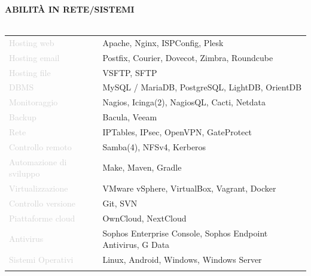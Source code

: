 \documentclass{article}
\begin{document}
\textbf{\textcolor{deepblue}{ABILIT\`A IN RETE/SISTEMI}} \\\\ \hfill
\begin{tabular}{ R{4cm} l }
	\textcolor{lightgray}{Hosting web}             & Apache, Nginx, ISPConfig, Plesk                              \\ \hfill
	\textcolor{lightgray}{Hosting email}           & Postfix, Courier, Dovecot, Zimbra, Roundcube                 \\ \hfill
	\textcolor{lightgray}{Hosting file}            & VSFTP, SFTP                                                  \\ \hfill
	\textcolor{lightgray}{DBMS}                    & MySQL / MariaDB, PostgreSQL, LightDB, OrientDB               \\ \hfill
	\textcolor{lightgray}{Monitoraggio}            & Nagios, Icinga(2), NagiosQL, Cacti, Netdata                  \\ \hfill
	\textcolor{lightgray}{Backup}                  & Bacula, Veeam                                                \\ \hfill
	\textcolor{lightgray}{Rete}                    & IPTables, IPsec, OpenVPN, GateProtect                        \\ \hfill
	\textcolor{lightgray}{Controllo remoto}        & Samba(4), NFSv4, Kerberos                                    \\ \hfill
	\textcolor{lightgray}{Automazione di sviluppo} & Make, Maven, Gradle                                          \\ \hfill
	\textcolor{lightgray}{Virtualizzazione}        & VMware vSphere, VirtualBox, Vagrant, Docker                  \\ \hfill
	\textcolor{lightgray}{Controllo versione}      & Git, SVN                                                     \\ \hfill
	\textcolor{lightgray}{Piattaforme cloud}       & OwnCloud, NextCloud                                          \\ \hfill
	\textcolor{lightgray}{Antivirus}               & Sophos Enterprise Console, Sophos Endpoint Antivirus, G Data \\ \hfill
	\textcolor{lightgray}{Sistemi Operativi}       & Linux, Android, Windows, Windows Server                      \\ \hfill
\end{tabular}
\end{document}
